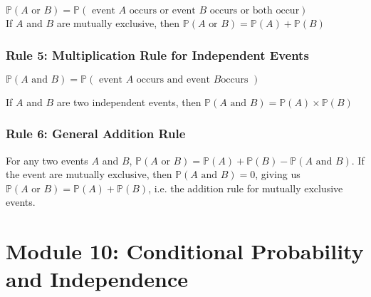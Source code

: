 \documentclass[12pt letter]{report}
\begin{document}

$\mathbb{P} \left( A \text{ or } B \right) = \mathbb{P} \left( \text{ event } A \text{ occurs or event } B \text{ occurs
		or both occur} \right)  $\\


\noindent If $A$ and $B$ are mutually exclusive, then $\mathbb{P} \left( A \text{ or } B \right) = \mathbb{P} \left( A
	\right) + \mathbb{P} \left( B \right)   $

\subsection{Rule 5: Multiplication Rule for Independent Events}
$\mathbb{P} \left( A \text{ and } B \right) = \mathbb{P} \left( \text{ event } A \text{ occurs and event } B \text{
		occurs } \right)  $



\noindent If $A$ and $B$ are two independent events, then $\mathbb{P} \left( A \text{ and } B \right) = \mathbb{P} \left( A
	\right)  \times \mathbb{P} \left( B \right)  $

\subsection{Rule 6: General Addition Rule}

For any two events $A$ and $B$, $\mathbb{P} \left( A \text{ or } B \right) = \mathbb{P} \left( A \right) + \mathbb{P}
	\left( B \right) - \mathbb{P} \left( A \text{ and } B \right)    $. If the event are mutually exclusive, then
$\mathbb{P} \left( A \text{ and } B \right) = 0 $, giving us $\mathbb{P} \left( A \text{ or } B \right) =
	\mathbb{P}\left( A \right) + \mathbb{P} \left( B \right)   $, i.e. the addition rule for mutually exclusive events.


\chapter{Module 10: Conditional Probability and Independence}
\end{document}
